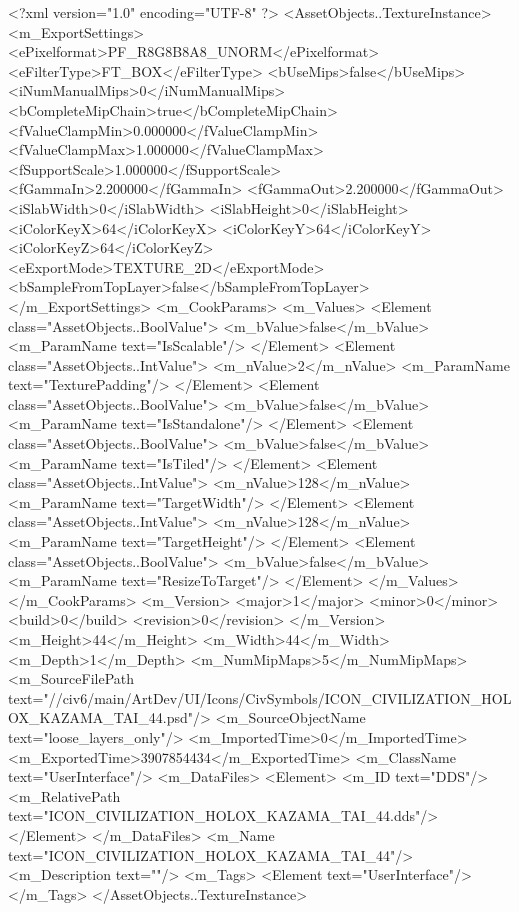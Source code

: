 <?xml version="1.0" encoding="UTF-8" ?>
<AssetObjects..TextureInstance>
	<m_ExportSettings>
		<ePixelformat>PF_R8G8B8A8_UNORM</ePixelformat>
		<eFilterType>FT_BOX</eFilterType>
		<bUseMips>false</bUseMips>
		<iNumManualMips>0</iNumManualMips>
		<bCompleteMipChain>true</bCompleteMipChain>
		<fValueClampMin>0.000000</fValueClampMin>
		<fValueClampMax>1.000000</fValueClampMax>
		<fSupportScale>1.000000</fSupportScale>
		<fGammaIn>2.200000</fGammaIn>
		<fGammaOut>2.200000</fGammaOut>
		<iSlabWidth>0</iSlabWidth>
		<iSlabHeight>0</iSlabHeight>
		<iColorKeyX>64</iColorKeyX>
		<iColorKeyY>64</iColorKeyY>
		<iColorKeyZ>64</iColorKeyZ>
		<eExportMode>TEXTURE_2D</eExportMode>
		<bSampleFromTopLayer>false</bSampleFromTopLayer>
	</m_ExportSettings>
	<m_CookParams>
		<m_Values>
			<Element class="AssetObjects..BoolValue">
				<m_bValue>false</m_bValue>
				<m_ParamName text="IsScalable"/>
			</Element>
			<Element class="AssetObjects..IntValue">
				<m_nValue>2</m_nValue>
				<m_ParamName text="TexturePadding"/>
			</Element>
			<Element class="AssetObjects..BoolValue">
				<m_bValue>false</m_bValue>
				<m_ParamName text="IsStandalone"/>
			</Element>
			<Element class="AssetObjects..BoolValue">
				<m_bValue>false</m_bValue>
				<m_ParamName text="IsTiled"/>
			</Element>
			<Element class="AssetObjects..IntValue">
				<m_nValue>128</m_nValue>
				<m_ParamName text="TargetWidth"/>
			</Element>
			<Element class="AssetObjects..IntValue">
				<m_nValue>128</m_nValue>
				<m_ParamName text="TargetHeight"/>
			</Element>
			<Element class="AssetObjects..BoolValue">
				<m_bValue>false</m_bValue>
				<m_ParamName text="ResizeToTarget"/>
			</Element>
		</m_Values>
	</m_CookParams>
	<m_Version>
		<major>1</major>
		<minor>0</minor>
		<build>0</build>
		<revision>0</revision>
	</m_Version>
	<m_Height>44</m_Height>
	<m_Width>44</m_Width>
	<m_Depth>1</m_Depth>
	<m_NumMipMaps>5</m_NumMipMaps>
	<m_SourceFilePath text="//civ6/main/ArtDev/UI/Icons/CivSymbols/ICON_CIVILIZATION_HOLOX_KAZAMA_TAI_44.psd"/>
	<m_SourceObjectName text="loose_layers_only"/>
	<m_ImportedTime>0</m_ImportedTime>
	<m_ExportedTime>3907854434</m_ExportedTime>
	<m_ClassName text="UserInterface"/>
	<m_DataFiles>
		<Element>
			<m_ID text="DDS"/>
			<m_RelativePath text="ICON_CIVILIZATION_HOLOX_KAZAMA_TAI_44.dds"/>
		</Element>
	</m_DataFiles>
	<m_Name text="ICON_CIVILIZATION_HOLOX_KAZAMA_TAI_44"/>
	<m_Description text=""/>
	<m_Tags>
		<Element text="UserInterface"/>
	</m_Tags>
</AssetObjects..TextureInstance>

